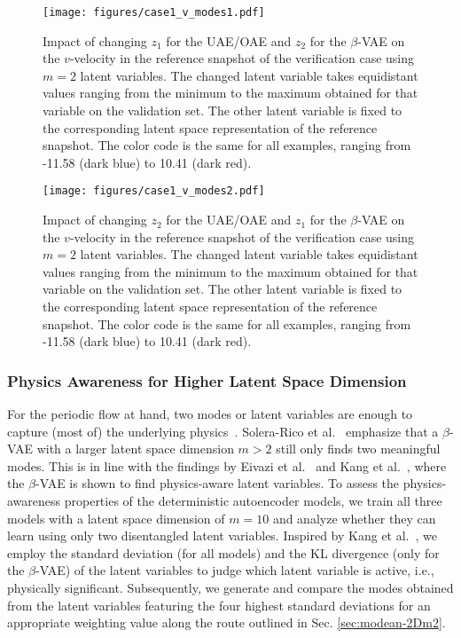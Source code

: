 \begin{figure}[h!]
    \centering
    \texttt{[image: figures/case1\_v\_modes1.pdf]}
    \caption{Impact of changing $z_1$ for the UAE/OAE and $z_2$ for the $\beta$-VAE on the $v$-velocity in the reference snapshot of the verification case using $m=2$ latent variables. The changed latent variable takes equidistant values ranging from the minimum to the maximum obtained for that variable on the validation set. The other latent variable is fixed to the corresponding latent space representation of the reference snapshot. The color code is the same for all examples, ranging from -11.58 (dark blue) to 10.41 (dark red).}
    \label{fig:case1_v_modes1}
\end{figure}

\begin{figure}[h!]
    \centering
    \texttt{[image: figures/case1\_v\_modes2.pdf]}
    \caption{Impact of changing $z_2$ for the UAE/OAE and $z_1$ for the $\beta$-VAE on the $v$-velocity in the reference snapshot of the verification case using $m=2$ latent variables. The changed latent variable takes equidistant values ranging from the minimum to the maximum obtained for that variable on the validation set. The other latent variable is fixed to the corresponding latent space representation of the reference snapshot. The color code is the same for all examples, ranging from -11.58 (dark blue) to 10.41 (dark red).}
    \label{fig:case1_v_modes2}
\end{figure}


\subsubsection{Physics Awareness for Higher Latent Space Dimension}
\label{sec:case1:higher_latent_dimension}
For the periodic flow at hand, two modes or latent variables are enough to capture (most of) the underlying physics~\cite{solera-rico:2024}. Solera-Rico et al.~\cite{solera-rico:2024} emphasize that a $\beta$-VAE with a larger latent space dimension $m>2$ still only finds two meaningful modes. This is in line with the findings by Eivazi et al.~\cite{eivazi:2022} and Kang et al.~\cite{kang:2022}, where the $\beta$-VAE is shown to find physics-aware latent variables. 
To assess the physics-awareness properties of the deterministic autoencoder models, we train all three models with a latent space dimension of $m=10$ and analyze whether they can learn using only two disentangled latent variables.  
Inspired by Kang et al.~\cite{kang:2022}, we employ the standard deviation 
(for all models) and the KL divergence (only for the $\beta$-VAE) of the latent variables to judge which latent variable  is active, i.e., physically significant. 
Subsequently, we generate and compare the modes obtained from the latent variables featuring the four highest standard deviations for an appropriate weighting value along the route outlined in Sec. \ref{sec:modean-2Dm2}.

